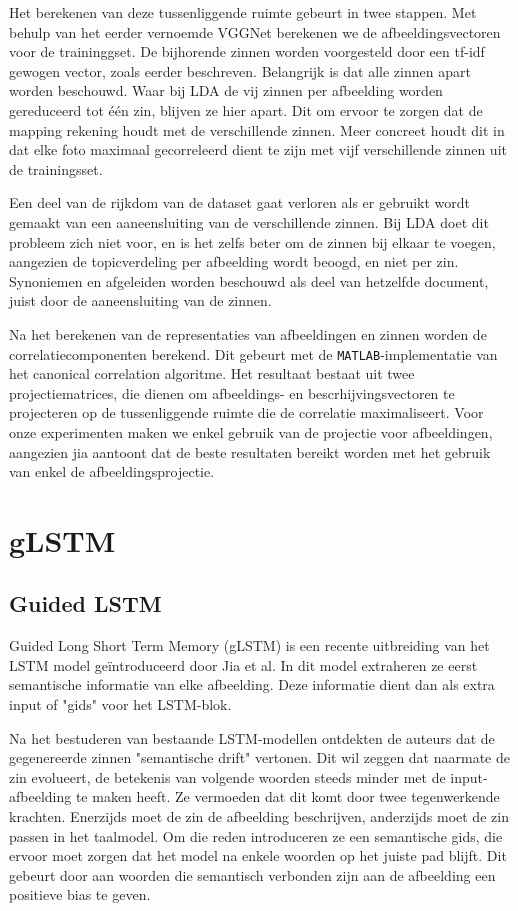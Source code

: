Het berekenen van deze tussenliggende ruimte gebeurt in twee stappen. Met behulp van het eerder vernoemde VGGNet berekenen we de afbeeldingsvectoren voor de traininggset. De bijhorende zinnen worden voorgesteld door een tf-idf gewogen vector, zoals eerder beschreven. Belangrijk is dat alle zinnen apart worden beschouwd. Waar bij LDA de vij zinnen per afbeelding worden gereduceerd tot \'e\'en zin, blijven ze hier apart. Dit om ervoor te zorgen dat de mapping rekening houdt met de verschillende zinnen. Meer concreet houdt dit in dat elke foto maximaal gecorreleerd dient te zijn met vijf verschillende zinnen uit de trainingsset.

Een deel van de rijkdom van de dataset gaat verloren als er gebruikt wordt gemaakt van een aaneensluiting van de verschillende zinnen. Bij LDA doet dit probleem zich niet voor, en is het zelfs beter om de zinnen bij elkaar te voegen, aangezien de topicverdeling per afbeelding wordt beoogd, en niet per zin. Synoniemen en afgeleiden worden beschouwd als deel van hetzelfde document, juist door de aaneensluiting van de zinnen.

Na het berekenen van de representaties van afbeeldingen en zinnen worden de correlatiecomponenten berekend. Dit gebeurt met de \texttt{MATLAB}-implementatie van het canonical correlation algoritme. Het resultaat bestaat uit twee projectiematrices, die dienen om afbeeldings- en bescrhijvingsvectoren te projecteren op de tussenliggende ruimte die de correlatie maximaliseert. Voor onze experimenten maken we enkel gebruik van de projectie voor afbeeldingen, aangezien jia  aantoont dat de beste resultaten bereikt worden met het gebruik van enkel de afbeeldingsprojectie. 

\section{gLSTM}
\subsection{Guided LSTM}
Guided Long Short Term Memory (gLSTM) is een recente uitbreiding van het LSTM model ge\"introduceerd door Jia et al.  In dit model extraheren ze eerst semantische informatie van elke afbeelding. Deze informatie dient dan als extra input of "gids" voor het LSTM-blok. 

Na het bestuderen van bestaande LSTM-modellen ontdekten de auteurs dat de gegenereerde zinnen "semantische drift" vertonen. Dit wil zeggen dat naarmate de zin evolueert, de betekenis van volgende woorden steeds minder met de input-afbeelding te maken heeft. Ze vermoeden dat dit komt door twee tegenwerkende krachten. Enerzijds moet de zin de afbeelding beschrijven, anderzijds moet de zin passen in het taalmodel. Om die reden introduceren ze een semantische gids, die ervoor moet zorgen dat het model na enkele woorden op het juiste pad blijft. Dit gebeurt door aan woorden die semantisch verbonden zijn aan de afbeelding een positieve bias te geven.

